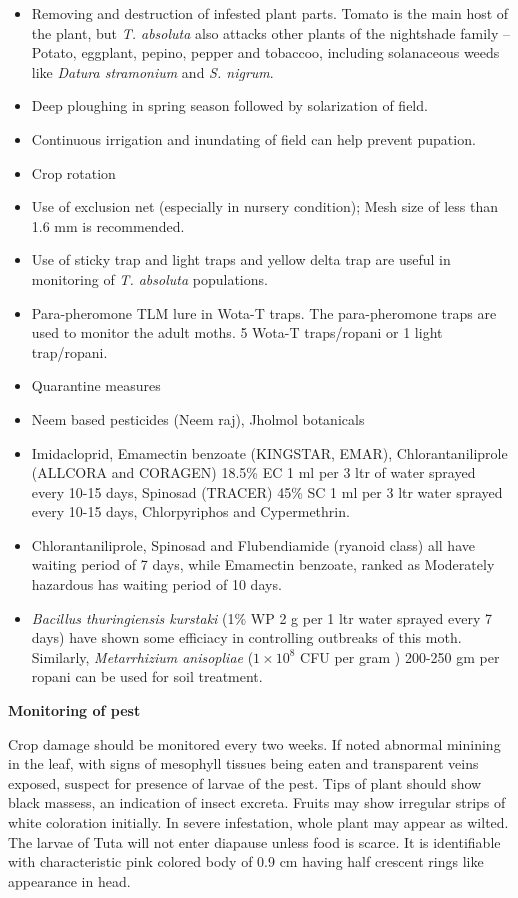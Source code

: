 \documentclass[
  openany]{book}
\providecommand{\tightlist}{%
  \setlength{\itemsep}{0pt}\setlength{\parskip}{0pt}}
\begin{document}
\begin{itemize}
\tightlist
\item
  Removing and destruction of infested plant parts. Tomato is the main host of the plant, but \emph{T. absoluta} also attacks other plants of the nightshade family -- Potato, eggplant, pepino, pepper and tobaccoo, including solanaceous weeds like \emph{Datura stramonium} and \emph{S. nigrum}.
\item
  Deep ploughing in spring season followed by solarization of field.
\item
  Continuous irrigation and inundating of field can help prevent pupation.
\item
  Crop rotation
\item
  Use of exclusion net (especially in nursery condition); Mesh size of less than 1.6 mm is recommended.
\item
  Use of sticky trap and light traps and yellow delta trap are useful in monitoring of \emph{T. absoluta} populations.
\item
  Para-pheromone TLM lure in Wota-T traps. The para-pheromone traps are used to monitor the adult moths. 5 Wota-T traps/ropani or 1 light trap/ropani.
\item
  Quarantine measures
\item
  Neem based pesticides (Neem raj), Jholmol botanicals
\item
  Imidacloprid, Emamectin benzoate (KINGSTAR, EMAR), Chlorantaniliprole (ALLCORA and CORAGEN) 18.5\% EC 1 ml per 3 ltr of water sprayed every 10-15 days, Spinosad (TRACER) 45\% SC 1 ml per 3 ltr water sprayed every 10-15 days, Chlorpyriphos and Cypermethrin.
\item
  Chlorantaniliprole, Spinosad and Flubendiamide (ryanoid class) all have waiting period of 7 days, while Emamectin benzoate, ranked as Moderately hazardous has waiting period of 10 days.
\item
  \emph{Bacillus thuringiensis kurstaki} (1\% WP 2 g per 1 ltr water sprayed every 7 days) have shown some efficiacy in controlling outbreaks of this moth. Similarly, \emph{Metarrhizium anisopliae} (\(1 \times 10^8\) CFU per gram ) 200-250 gm per ropani can be used for soil treatment.
\end{itemize}

\textbf{Monitoring of pest}

Crop damage should be monitored every two weeks. If noted abnormal minining in the leaf, with signs of mesophyll tissues being eaten and transparent veins exposed, suspect for presence of larvae of the pest. Tips of plant should show black massess, an indication of insect excreta. Fruits may show irregular strips of white coloration initially. In severe infestation, whole plant may appear as wilted. The larvae of Tuta will not enter diapause unless food is scarce. It is identifiable with characteristic pink colored body of 0.9 cm having half crescent rings like appearance in head.
\end{document}

